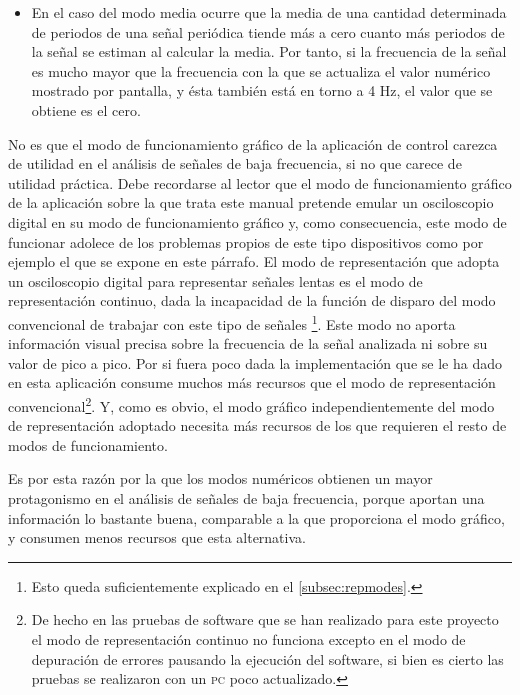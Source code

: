 \begin{itemize}
	\item En el caso del modo media ocurre que la media de una cantidad
		determinada de periodos de una señal periódica tiende más a
		cero cuanto más periodos de la señal se estiman al calcular
		la media. Por tanto, si la frecuencia de la señal es mucho
		mayor que la frecuencia con la que se actualiza el valor
		numérico mostrado por pantalla, y ésta también está en
		torno a 4 Hz, el valor que se obtiene es el cero.
\end{itemize}

No es que el modo de funcionamiento gráfico de la aplicación de control
carezca de utilidad en el análisis de señales de baja frecuencia, si no que
carece de utilidad práctica. Debe recordarse al lector que el modo de
funcionamiento gráfico de la aplicación sobre la que trata este manual
pretende emular un osciloscopio digital en su modo de funcionamiento
gráfico y, como consecuencia, este modo de funcionar adolece de los
problemas propios de este tipo dispositivos como por ejemplo el que se
expone en este párrafo. El modo de representación que adopta un
osciloscopio digital para representar señales lentas es el modo de
representación continuo, dada la incapacidad de la función de disparo del
modo convencional de trabajar con este tipo de señales \footnote{Esto queda
suficientemente explicado en el \vref{subsec:repmodes}.}. Este modo no
aporta información visual precisa sobre la frecuencia de la señal analizada
ni sobre su valor de pico a pico. Por si fuera poco dada la implementación
que se le ha dado en esta aplicación consume muchos más recursos que el
modo de representación convencional\footnote{De hecho en las pruebas de
software que se han realizado para este proyecto el modo de representación
continuo no funciona excepto en el modo de depuración de errores pausando
la ejecución del software, si bien es cierto las pruebas se realizaron con
un \textsc{pc} poco actualizado.}. Y, como es obvio, el modo gráfico
independientemente del modo de representación adoptado necesita más
recursos de los que requieren el resto de modos de funcionamiento.

Es por esta razón por la que los modos numéricos obtienen un mayor
protagonismo en el análisis de señales de baja frecuencia, porque aportan
una información lo bastante buena, comparable a la que proporciona el modo
gráfico, y consumen menos recursos que esta alternativa.
